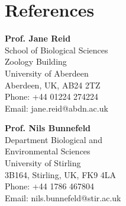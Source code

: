 \documentclass[letterpaper]{article}
\renewenvironment{itemize}{
  \begin{list}{}{
    \setlength{\leftmargin}{1.5em}
  }
}{
  \end{list}
}
\begin{document}
\section*{References}

\begin{minipage}{0.5\linewidth}

\begin{itemize}
\item {\bf Prof. Jane Reid} \\
School of Biological Sciences \\
Zoology Building \\
University of Aberdeen \\
Aberdeen, UK, AB24 2TZ \\
Phone: +44 01224 274224 \\
Email: jane.reid@abdn.ac.uk \\

\item {\bf Prof. Nils Bunnefeld} \\
Department Biological and \\ 
Environmental Sciences \\
University of Stirling \\
3B164, Stirling, UK, FK9 4LA \\
Phone: +44 1786 467804 \\
Email: nils.bunnefeld@stir.ac.uk \\

\end{itemize}
\end{minipage}
\end{document}
